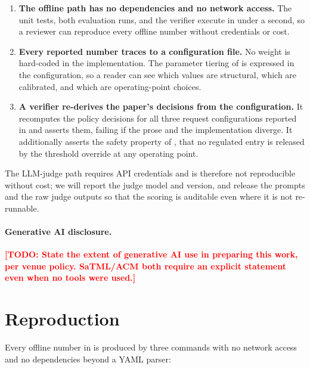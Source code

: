 \documentclass[conference,compsoc]{IEEEtran}
\newcommand{\todo}[1]{\textcolor{red}{\textbf{[TODO: #1]}}}
\begin{document}
\begin{enumerate}
  \item \textbf{The offline path has no dependencies and no network access.}
  The unit tests, both evaluation runs, and the verifier execute in under a
  second, so a reviewer can reproduce every offline number without credentials
  or cost.
  \item \textbf{Every reported number traces to a configuration file.} No
  weight is hard-coded in the implementation. The parameter tiering of
   is expressed in the configuration, so a reader can
  see which values are structural, which are calibrated, and which are
  operating-point choices.
  \item \textbf{A verifier re-derives the paper's decisions from the
  configuration.} It recomputes the policy decisions for all three request
  configurations reported in  and asserts them, failing if the
  prose and the implementation diverge. It additionally asserts the safety
  property of , that no regulated entry is released
  by the threshold override at any operating point.
\end{enumerate}

The LLM-judge path requires API credentials and is therefore not reproducible
without cost; we will report the judge model and version, and release the
prompts and the raw judge outputs so that the scoring is auditable even where
it is not re-runnable.

\paragraph{Generative AI disclosure.} \todo{State the extent of generative AI
use in preparing this work, per venue policy. SaTML/ACM both require an
explicit statement even when no tools were used.}

\balance



\appendices
\section{Reproduction}
\label{app:repro}

Every offline number in  is produced by three commands with no
network access and no dependencies beyond a YAML parser:
\end{document}
